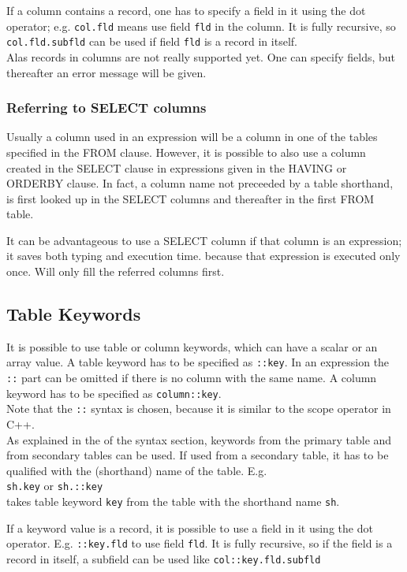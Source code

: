 If a column contains a record, one has to specify a field in it
using the dot operator; e.g. \texttt{col.fld} means use field
\texttt{fld} in the column. It is fully recursive, so
\texttt{col.fld.subfld} can be used if field \texttt{fld} is a record
in itself.
\\Alas records in columns are not really supported yet. One can specify
fields, but thereafter an error message will be given.

\subsubsection{Referring to SELECT columns}
Usually a column used in an expression will be a column in one of
the tables specified in the FROM clause. However, it is possible to
also use a column created in the SELECT clause in expressions given in
the HAVING or ORDERBY clause.
In fact, a column name not preceeded by a table shorthand, is first
looked up in the SELECT columns and thereafter in the first FROM table.

It can be advantageous to use a SELECT column if that column
is an expression; it saves both typing and execution time.
 because that
expression is executed only once.
Will only fill the referred columns first.

\subsection{\label{TAQL:KEYWORDS}Table Keywords}
It is possible to use table or column keywords, which can have
a scalar or an array value. A table keyword has to be specified
as \texttt{::key}. In an expression the \texttt{::} part can be omitted
if there is no column with the same name.
A column keyword has to be specified as \texttt{column::key}.
\\Note that the \texttt{::} syntax is chosen, because it is similar
to the scope operator in C++.
\\
As explained in the  of the syntax
section, keywords from the primary table and from secondary tables
can be used. If used from a secondary table, it has to be qualified
with the (shorthand) name of the table. E.g.
\\\texttt{sh.key} or \texttt{sh.::key}
\\takes table keyword \texttt{key} from the table with the shorthand name
\texttt{sh}.

If a keyword value is a record, it is possible to use
a field in it using the dot operator. E.g. \texttt{::key.fld}
to use field \texttt{fld}. It is fully recursive, so if the
field is a record in itself, a subfield can be used like
\texttt{col::key.fld.subfld}

